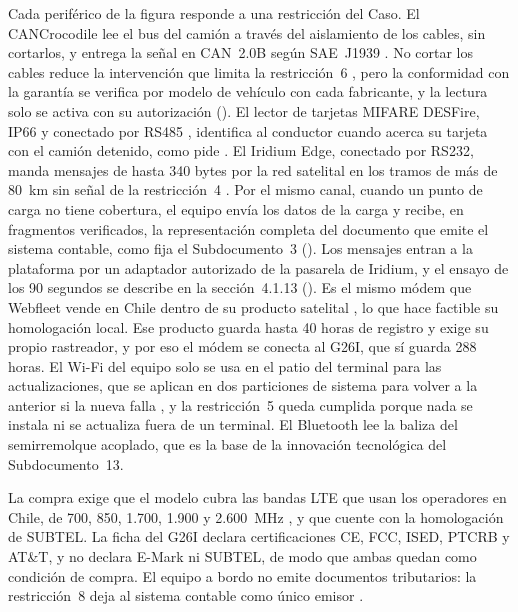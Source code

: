 Cada periférico de la figura responde a una restricción del Caso. El CANCrocodile lee el bus del camión
a través del aislamiento de los cables, sin cortarlos, y entrega la señal en CAN~2.0B según SAE~J1939
\parencite{technoton_cancrocodile}. No cortar los cables reduce la intervención que limita la
restricción~6 , pero la conformidad con la garantía se verifica por modelo de
vehículo con cada fabricante, y la lectura solo se activa con su autorización (). El lector de tarjetas MIFARE DESFire, IP66 y conectado por RS485
\parencite{gao_desfire}, identifica al conductor cuando acerca su tarjeta con el camión detenido, como
pide . El Iridium Edge, conectado por RS232, manda mensajes de hasta 340 bytes por
la red satelital \parencite{groundcontrol_edge} en los tramos de más de 80~km sin señal de la
restricción~4 . Por el mismo canal, cuando un punto de carga no tiene
cobertura, el equipo envía los datos de la carga y recibe, en fragmentos verificados, la representación
completa del documento que emite el sistema contable, como fija el Subdocumento~3
(). Los mensajes entran a la plataforma por un adaptador autorizado de la
pasarela de Iridium, y el ensayo de los 90 segundos se describe en la sección~4.1.13
(). Es el mismo módem que Webfleet vende en Chile dentro de su
producto satelital \parencite{webfleet_sat_cl}, lo que hace factible su homologación local. Ese
producto guarda hasta 40 horas de registro y exige su propio rastreador, y por eso el módem se conecta
al G26I, que sí guarda 288 horas. El Wi-Fi del equipo solo se usa en el patio del terminal para las
actualizaciones, que se aplican en dos particiones de sistema para volver a la anterior si la nueva
falla \parencite{mender_variables}, y la restricción~5 queda cumplida porque nada se instala ni se
actualiza fuera de un terminal. El Bluetooth lee la baliza del semirremolque acoplado, que es la base
de la innovación tecnológica del Subdocumento~13.

La compra exige que el modelo cubra las bandas LTE que usan los operadores en Chile, de 700, 850,
1.700, 1.900 y 2.600~MHz \parencite{subtel_bandas}, y que cuente con la homologación de SUBTEL. La ficha
del G26I declara certificaciones CE, FCC, ISED, PTCRB y AT\&T, y no declara E-Mark ni SUBTEL, de modo
que ambas quedan como condición de compra. El equipo a bordo no emite documentos tributarios: la
restricción~8 deja al sistema contable como único emisor .

